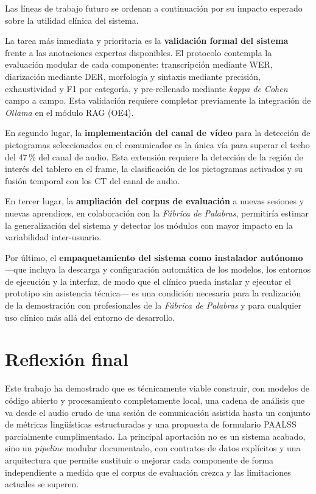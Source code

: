 Las líneas de trabajo futuro se ordenan a continuación por su impacto esperado sobre
la utilidad clínica del sistema.

La tarea más inmediata y prioritaria es la \textbf{validación formal del sistema}
frente a las anotaciones expertas disponibles. El protocolo contempla la evaluación
modular de cada componente: transcripción mediante \ac{WER}, diarización mediante
\ac{DER}, morfología y sintaxis mediante precisión, exhaustividad y F1 por categoría,
y pre-rellenado mediante \emph{kappa de Cohen} campo a campo. Esta validación requiere
completar previamente la integración de \emph{Ollama} en el módulo \ac{RAG} (OE4).

En segundo lugar, la \textbf{implementación del canal de vídeo} para la detección de
pictogramas seleccionados en el comunicador es la única vía para superar el techo del
47\,\% del canal de audio. Esta extensión requiere la detección de la región de interés
del tablero en el frame, la clasificación de los pictogramas activados y su fusión
temporal con los \ac{CT} del canal de audio.

En tercer lugar, la \textbf{ampliación del corpus de evaluación} a nuevas sesiones y
nuevas aprendices, en colaboración con la \emph{Fábrica de Palabras}, permitiría
estimar la generalización del sistema y detectar los módulos con mayor impacto en la
variabilidad inter-usuario.

Por último, el \textbf{empaquetamiento del sistema como instalador autónomo} —que
incluya la descarga y configuración automática de los modelos, los entornos de
ejecución y la interfaz, de modo que el clínico pueda instalar y ejecutar el
prototipo sin asistencia técnica— es una condición necesaria para la realización de
la demostración con profesionales de la \emph{Fábrica de Palabras} y para cualquier
uso clínico más allá del entorno de desarrollo.


\section{Reflexión final}
\label{sec:conclusiones_reflexion}

Este trabajo ha demostrado que es técnicamente viable construir, con modelos de
código abierto y procesamiento completamente local, una cadena de análisis que va
desde el audio crudo de una sesión de comunicación asistida hasta un conjunto de
métricas lingüísticas estructuradas y una propuesta de formulario \ac{PAALSS}
parcialmente cumplimentado. La principal aportación no es un sistema acabado, sino
un \emph{pipeline} modular documentado, con contratos de datos explícitos y una
arquitectura que permite sustituir o mejorar cada componente de forma independiente
a medida que el corpus de evaluación crezca y las limitaciones actuales se superen.

